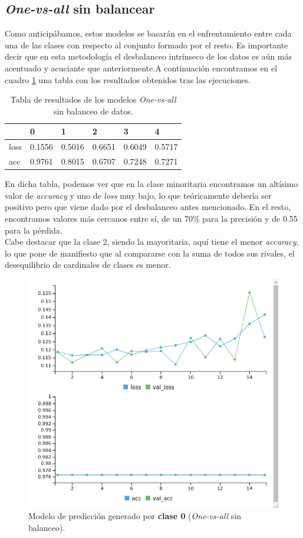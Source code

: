 \documentclass[]{article}
\begin{document}
	\subsection{\textit{One-vs-all} sin balancear}
	
		Como anticipábamos, estos modelos se basarán en el enfrentamiento entre cada una de las clases con respecto al conjunto formado por el resto. Es importante decir que en esta metodología el desbalanceo intrínseco de los datos es aún más acentuado y acuciante que anteriormente.A continuación encontramos en el cuadro \ref{ova-sin-balanceo} una tabla con los resultados obtenidos tras las ejecuciones.\\
			
		\begin{table}[h]
			\centering
			\begin{tabular}{llllll}
				     & 0      & 1      & 2      & 3      & 4      \\ \hline
				loss & 0.1556 & 0.5016 & 0.6651 & 0.6049 & 0.5717 \\
				acc  & 0.9761 & 0.8015 & 0.6707 & 0.7248 & 0.7271
			\end{tabular}%
			\caption{Tabla de resultados de los modelos \textit{One-vs-all} sin balanceo de datos.}
			\label{ova-sin-balanceo}
		\end{table}
	
		En dicha tabla, podemos ver que en la clase minoritaria encontramos un altísimo valor de \textit{accuracy} y uno de \textit{loss} muy bajo, lo que teóricamente debería ser positivo pero que viene dado por el desbalanceo antes mencionado. En el resto, encontramos valores más cercanos entre sí, de un 70\% para la precisión y de 0.55 para la pérdida.\\
		
		Cabe destacar que la clase 2, siendo la mayoritaria, aquí tiene el menor \textit{accuracy}, lo que pone de manifiesto que al compararse con la suma de todos sus rivales, el desequilibrio de cardinales de clases es menor.\\
	
		\begin{figure}[h]
			\centering
			\includegraphics[width=0.6\columnwidth]{./img/OVA_0}
			\caption{Modelo de predicción generado por \textbf{clase 0} (\textit{One-vs-all} sin balanceo).}
			\label{ova-0}
		\end{figure}
		
\end{document}
